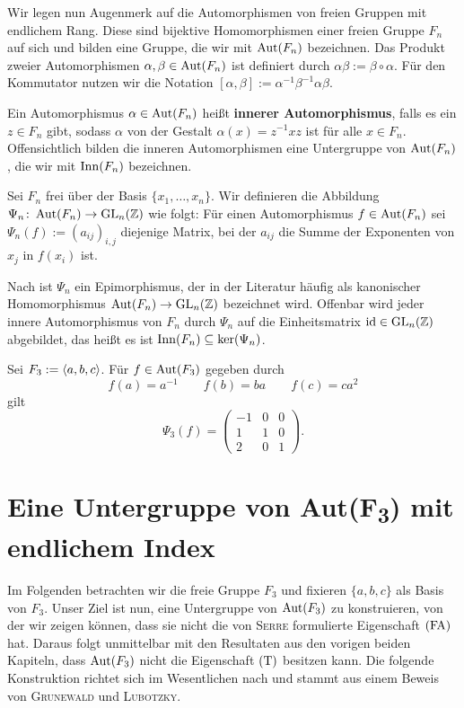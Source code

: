 Wir legen nun Augenmerk auf die Automorphismen von freien Gruppen mit endlichem Rang. Diese sind bijektive Homomorphismen einer freien Gruppe $F_n$ auf sich und bilden eine Gruppe, die wir mit $\operatorname{Aut}(F_n)$ bezeichnen. Das Produkt zweier Automorphismen $\alpha, \beta \in \operatorname{Aut}(F_n)$ ist definiert durch $\alpha\beta := \beta \circ \alpha$. Für den Kommutator nutzen wir die Notation $[\alpha,\beta] := \alpha^{-1}\beta^{-1}\alpha\beta$.

Ein Automorphismus $\alpha \in \operatorname{Aut}(F_n)$ heißt \textbf{innerer Automorphismus}, falls es ein $z \in F_n$ gibt, sodass $\alpha$ von der Gestalt $\alpha(x) = z^{-1} x z$ ist für alle $x \in F_n$. Offensichtlich bilden die inneren Automorphismen eine Untergruppe von $\operatorname{Aut}(F_n)$, die wir mit $\operatorname{Inn}(F_n)$ bezeichnen.

\begin{definition}
	Sei $F_n$ frei über der Basis $\{x_1, \dots, x_n\}$. Wir definieren die Abbildung $\Psi_n\colon \operatorname{Aut}(F_n) \rightarrow \operatorname{GL}_n(\mathbb{Z})$ wie folgt: Für einen Automorphismus $f \in \operatorname{Aut}(F_n)$ sei $\Psi_n(f) := (a_{ij})_{i,j}$ diejenige Matrix, bei der $a_{ij}$ die Summe der Exponenten von $x_j$ in $f(x_i)$ ist.
\end{definition}

Nach \cite[Theorem 1.7]{Bogopolski} ist $\Psi_n$ ein Epimorphismus, der in der Literatur häufig als kanonischer Homomorphismus $\operatorname{Aut}(F_n) \rightarrow \operatorname{GL}_n(\mathbb{Z})$ bezeichnet wird. Offenbar wird jeder innere Automorphismus von $F_n$ durch $\Psi_n$ auf die Einheitsmatrix $\operatorname{id} \in \operatorname{GL}_n(\mathbb{Z})$ abgebildet, das heißt es ist $\operatorname{Inn}(F_n) \subseteq \ker(\Psi_n)$.

\begin{beispiel}
	Sei $F_3 := \langle a,b,c\rangle$. Für $f \in \operatorname{Aut}(F_3)$ gegeben durch
	\[
		f(a) = a^{-1} \qquad f(b) = ba \qquad f(c) = ca^2
	\]
	gilt
	\[
		\Psi_3(f) = \begin{pmatrix}
			-1 & 0 & 0 \\
			1  & 1 & 0 \\
			2  & 0 & 1
		\end{pmatrix}.
	\]
\end{beispiel}

\section{Eine Untergruppe von Aut(F\textsubscript{3}) mit endlichem Index}
Im Folgenden betrachten wir die freie Gruppe $F_3$ und fixieren $\{a,b,c\}$ als Basis von $F_3$. Unser Ziel ist nun, eine Untergruppe von $\operatorname{Aut}(F_3)$ zu konstruieren, von der wir zeigen können, dass sie nicht die von \textsc{Serre} formulierte Eigenschaft $\operatorname{(FA)}$ hat. Daraus folgt unmittelbar mit den Resultaten aus den vorigen beiden Kapiteln, dass $\operatorname{Aut}(F_3)$ nicht die Eigenschaft $\operatorname{(T)}$ besitzen \linebreak \newpage
kann. Die folgende Konstruktion richtet sich im Wesentlichen nach \cite[\hspace{0cm}2]{BogopolskiVikentiev} und stammt aus einem Beweis von \textsc{Grunewald} und \textsc{Lubotzky}.

